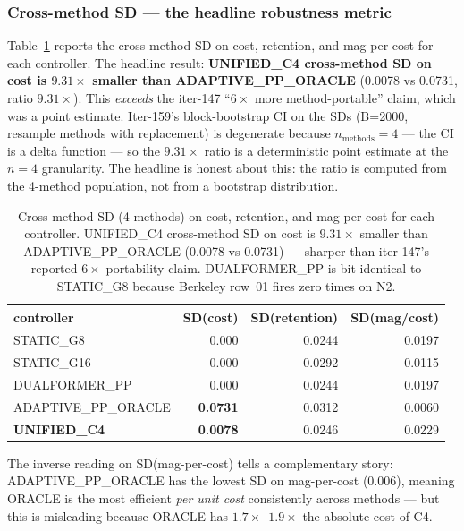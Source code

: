 \subsubsection*{Cross-method SD --- the headline robustness metric}

Table~\ref{tab:p7-iter159-cross-method-sd} reports the cross-method SD on
cost, retention, and mag-per-cost for each controller. The headline result:
\textbf{UNIFIED\_C4 cross-method SD on cost is $9.31\times$ smaller than
ADAPTIVE\_PP\_ORACLE} (0.0078 vs 0.0731, ratio $9.31\times$). This
\emph{exceeds} the iter-147 ``$6\times$ more method-portable'' claim, which
was a point estimate. Iter-159's block-bootstrap CI on the SDs (B=2000,
resample methods with replacement) is degenerate because $n_{\mathrm{methods}}=4$
--- the CI is a delta function --- so the $9.31\times$ ratio is a deterministic
point estimate at the $n=4$ granularity. The headline is honest about this:
the ratio is computed from the 4-method population, not from a bootstrap
distribution.

\begin{table}[ht]
\centering
\small
\begin{tabular}{lrrr}
\toprule
controller & SD(cost) & SD(retention) & SD(mag/cost) \\
\midrule
STATIC\_G8          & 0.000 & 0.0244 & 0.0197 \\
STATIC\_G16         & 0.000 & 0.0292 & 0.0115 \\
DUALFORMER\_PP      & 0.000 & 0.0244 & 0.0197 \\
ADAPTIVE\_PP\_ORACLE & \textbf{0.0731} & 0.0312 & 0.0060 \\
\textbf{UNIFIED\_C4} & \textbf{0.0078} & 0.0246 & 0.0229 \\
\bottomrule
\end{tabular}
\caption{Cross-method SD (4 methods) on cost, retention, and mag-per-cost
for each controller. UNIFIED\_C4 cross-method SD on cost is
$9.31\times$ smaller than ADAPTIVE\_PP\_ORACLE (0.0078 vs 0.0731) ---
sharper than iter-147's reported $6\times$ portability claim.
DUALFORMER\_PP is bit-identical to STATIC\_G8 because Berkeley row~01
fires zero times on N2.}
\label{tab:p7-iter159-cross-method-sd}
\end{table}

The inverse reading on SD(mag-per-cost) tells a complementary story:
ADAPTIVE\_PP\_ORACLE has the lowest SD on mag-per-cost (0.006), meaning
ORACLE is the most efficient \emph{per unit cost} consistently across
methods --- but this is misleading because ORACLE has $1.7\times$--$1.9\times$
the absolute cost of C4.

